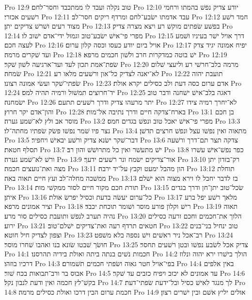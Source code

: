 Pro 12:9  טוב נקלה ועבד לו ממתכבד וחסר־לחם׃
Pro 12:10  יודע צדיק נפשׁ בהמתו ורחמי רשׁעים אכזרי׃
Pro 12:11  עבד אדמתו ישׂבע־לחם ומרדף ריקים חסר־לב׃
Pro 12:12  חמד רשׁע מצוד רעים ושׁרשׁ צדיקים יתן׃
Pro 12:13  בפשׁע שׂפתים מוקשׁ רע ויצא מצרה צדיק׃
Pro 12:14  מפרי פי־אישׁ ישׂבע־טוב וגמול ידי־אדם ישׁוב לו׃
Pro 12:15  דרך אויל ישׁר בעיניו ושׁמע לעצה חכם׃
Pro 12:16  אויל ביום יודע כעסו וכסה קלון ערום׃
Pro 12:17  יפיח אמונה יגיד צדק ועד שׁקרים מרמה׃
Pro 12:18  ישׁ בוטה כמדקרות חרב ולשׁון חכמים מרפא׃
Pro 12:19  שׂפת־אמת תכון לעד ועד־ארגיעה לשׁון שׁקר׃
Pro 12:20  מרמה בלב־חרשׁי רע וליעצי שׁלום שׂמחה׃
Pro 12:21  לא־יאנה לצדיק כל־און ורשׁעים מלאו רע׃
Pro 12:22  תועבת יהוה שׂפתי־שׁקר ועשׂי אמונה רצונו׃
Pro 12:23  אדם ערום כסה דעת ולב כסילים יקרא אולת׃
Pro 12:24  יד־חרוצים תמשׁול ורמיה תהיה למס׃
Pro 12:25  דאגה בלב־אישׁ ישׁחנה ודבר טוב ישׂמחנה׃
Pro 12:26  יתר מרעהו צדיק ודרך רשׁעים תתעם׃
Pro 12:27  לא־יחרך רמיה צידו והון־אדם יקר חרוץ׃
Pro 12:28  בארח־צדקה חיים ודרך נתיבה אל־מות׃
Pro 13:1  בן חכם מוסר אב ולץ לא־שׁמע גערה׃
Pro 13:2  מפרי פי־אישׁ יאכל טוב ונפשׁ בגדים חמס׃
Pro 13:3  נצר פיו שׁמר נפשׁו פשׂק שׂפתיו מחתה־לו׃
Pro 13:4  מתאוה ואין נפשׁו עצל ונפשׁ חרצים תדשׁן׃
Pro 13:5  דבר־שׁקר ישׂנא צדיק ורשׁע יבאישׁ ויחפיר׃
Pro 13:6  צדקה תצר תם־דרך ורשׁעה תסלף חטאת׃
Pro 13:7  ישׁ מתעשׁר ואין כל מתרושׁשׁ והון רב׃
Pro 13:8  כפר נפשׁ־אישׁ עשׁרו ורשׁ לא־שׁמע גערה׃
Pro 13:9  אור־צדיקים ישׂמח ונר רשׁעים ידעך׃
Pro 13:10  רק־בזדון יתן מצה ואת־נועצים חכמה׃
Pro 13:11  הון מהבל ימעט וקבץ על־יד ירבה׃
Pro 13:12  תוחלת ממשׁכה מחלה־לב ועץ חיים תאוה באה׃
Pro 13:13  בז לדבר יחבל לו וירא מצוה הוא ישׁלם׃
Pro 13:14  תורת חכם מקור חיים לסור ממקשׁי מות׃
Pro 13:15  שׂכל־טוב יתן־חן ודרך בגדים איתן׃
Pro 13:16  כל־ערום יעשׂה בדעת וכסיל יפרשׂ אולת׃
Pro 13:17  מלאך רשׁע יפל ברע וציר אמונים מרפא׃
Pro 13:18  רישׁ וקלון פורע מוסר ושׁומר תוכחת יכבד׃
Pro 13:19  תאוה נהיה תערב לנפשׁ ותועבת כסילים סור מרע׃
Pro 13:20  הלוך את־חכמים וחכם ורעה כסילים ירוע׃
Pro 13:21  חטאים תרדף רעה ואת־צדיקים ישׁלם־טוב׃
Pro 13:22  טוב ינחיל בני־בנים וצפון לצדיק חיל חוטא׃
Pro 13:23  רב־אכל ניר ראשׁים וישׁ נספה בלא משׁפט׃
Pro 13:24  חושׂך שׁבטו שׂונא בנו ואהבו שׁחרו מוסר׃
Pro 13:25  צדיק אכל לשׂבע נפשׁו ובטן רשׁעים תחסר׃
Pro 14:1  חכמות נשׁים בנתה ביתה ואולת בידיה תהרסנו׃
Pro 14:2  הולך בישׁרו ירא יהוה ונלוז דרכיו בוזהו׃
Pro 14:3  בפי־אויל חטר גאוה ושׂפתי חכמים תשׁמורם׃
Pro 14:4  באין אלפים אבוס בר ורב־תבואות בכח שׁור׃
Pro 14:5  עד אמונים לא יכזב ויפיח כזבים עד שׁקר׃
Pro 14:6  בקשׁ־לץ חכמה ואין ודעת לנבון נקל׃
Pro 14:7  לך מנגד לאישׁ כסיל ובל־ידעת שׂפתי־דעת׃
Pro 14:8  חכמת ערום הבין דרכו ואולת כסילים מרמה׃
Pro 14:9  אולים יליץ אשׁם ובין ישׁרים רצון׃
